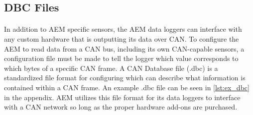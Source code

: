 \subsection{DBC Files}

\paragraph{}
In addition to AEM specific sensors, the AEM data loggers can interface with any custom hardware that is outputting its data over CAN.
To configure the AEM to read data from a CAN bus, including its own CAN-capable sensors, a configuration file must be made to tell the logger which value corresponds to which bytes of a specific CAN frame.
A CAN Database file (.dbc) is a standardized file format for configuring which can describe what information is contained within a CAN frame.
An example .dbc file can be seen in \cref{lst:ex_dbc} in the appendix.
AEM utilizes this file format for its data loggers to interface with a CAN network so long as the proper hardware add-ons are purchased.